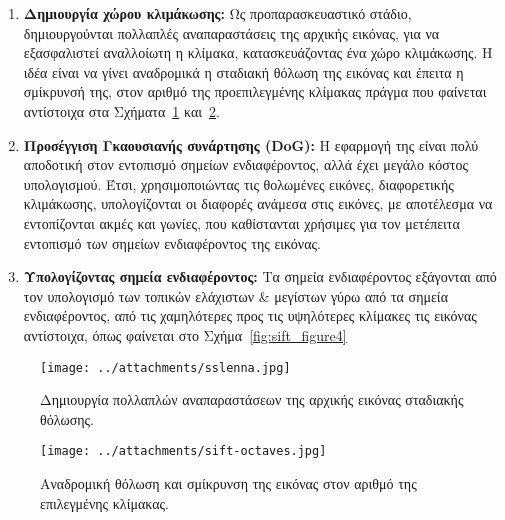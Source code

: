 \begin{enumerate}

\item \textbf{Δημιουργία χώρου κλιμάκωσης:} Ως προπαρασκευαστικό στάδιο, δημιουργούνται 
πολλαπλές αναπαραστάσεις της αρχικής εικόνας, για να εξασφαλιστεί αναλλοίωτη η κλίμακα,
κατασκευάζοντας ένα χώρο κλιμάκωσης. Η ιδέα είναι να γίνει αναδρομικά η σταδιακή θόλωση 
της εικόνας και έπειτα η σμίκρυνσή της, στον αριθμό της προεπιλεγμένης κλίμακας πράγμα που φαίνεται αντίστοιχα στα Σχήματα~\ref{fig:sift_figure1} και~\ref{fig:sift_figure2}.

\item \textbf{Προσέγγιση Γκαουσιανής συνάρτησης (DoG):}  Η εφαρμογή της είναι πολύ αποδοτική στον 
εντοπισμό σημείων ενδιαφέροντος, αλλά έχει μεγάλο κόστος υπολογισμού.
Έτσι, χρησιμοποιώντας τις θολωμένες εικόνες, διαφορετικής κλιμάκωσης, υπολογίζονται οι
διαφορές ανάμεσα στις εικόνες, με αποτέλεσμα να εντοπίζονται ακμές και γωνίες, που καθίστανται
χρήσιμες για τον μετέπειτα εντοπισμό των σημείων ενδιαφέροντος της εικόνας. 

\item \textbf{Υπολογίζοντας σημεία ενδιαφέροντος:} Τα σημεία ενδιαφέροντος εξάγονται από τον
υπολογισμό των τοπικών ελάχιστων \& μεγίστων γύρω από τα σημεία ενδιαφέροντος,
από τις χαμηλότερες προς τις υψηλότερες κλίμακες τις εικόνας αντίστοιχα, όπως φαίνεται στο Σχήμα~\ref{fig:sift_figure4}

\end{enumerate}

\begin{figure}[!ht]
\centering
\begin{minipage}[b]{0.5\linewidth}
\texttt{[image: ../attachments/sslenna.jpg]}
\end{minipage}
\caption{Δημιουργία πολλαπλών αναπαραστάσεων της αρχικής εικόνας σταδιακής θόλωσης.}
\label{fig:sift_figure1}
\end{figure}



\newpage



\begin{figure}[!ht]
\centering
\begin{minipage}[b]{0.5\linewidth}
\texttt{[image: ../attachments/sift-octaves.jpg]}
\end{minipage}
\caption{Αναδρομική θόλωση και σμίκρυνση της εικόνας στον αριθμό της επιλεγμένης κλίμακας.}
\label{fig:sift_figure2}
\end{figure}

